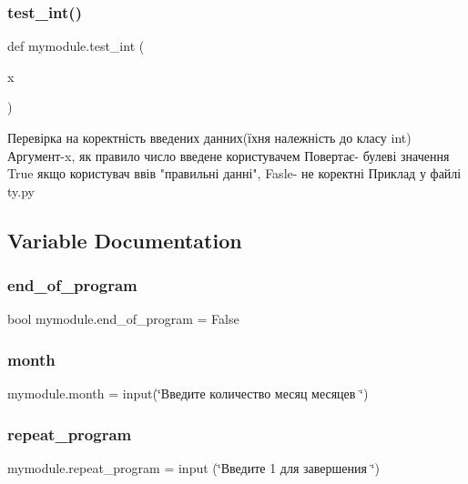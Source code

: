 \subsubsection{\texorpdfstring{test\+\_\+int()}{test\_int()}}
{\footnotesize\ttfamily def mymodule.\+test\+\_\+int (\begin{DoxyParamCaption}\item[{}]{x }\end{DoxyParamCaption})}

\begin{DoxyVerb}Перевірка на коректність введених данних(їхня належність до класу int)
Аргумент-x, як правило число введене користувачем
Повертає- булеві значення True якщо користувач ввів "правильні данні", Fasle- не коректні 
Приклад у файлі ty.py
\end{DoxyVerb}
 

\subsection{Variable Documentation}
\mbox{\label{namespacemymodule_a1e213dd23d342fd86fdf1b3f0cb7cd11}} 
\subsubsection{\texorpdfstring{end\+\_\+of\+\_\+program}{end\_of\_program}}
{\footnotesize\ttfamily bool mymodule.\+end\+\_\+of\+\_\+program = False}

\mbox{\label{namespacemymodule_a773d7ebbde62af8bcd9dfc0ce6cdeda8}} 
\subsubsection{\texorpdfstring{month}{month}}
{\footnotesize\ttfamily mymodule.\+month = input(\char`\"{}Введите количество месяц месяцев \char`\"{})}

\mbox{\label{namespacemymodule_aeb351b5a4b23c6ec88d987a0edbed30b}} 
\subsubsection{\texorpdfstring{repeat\+\_\+program}{repeat\_program}}
{\footnotesize\ttfamily mymodule.\+repeat\+\_\+program = input (\char`\"{}Введите 1 для завершения \char`\"{})}

